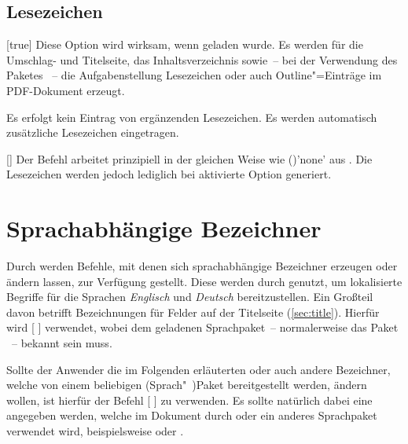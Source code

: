 \begin{Declaration*}{}
\begin{Declaration*}{}
\begin{Declaration*}{}
\subsection{Lesezeichen}
%
%
\begin{Declaration}{}[true]%
\printdeclarationlist%
%
%
%
%
%
%
%
Diese Option wird wirksam, wenn  geladen wurde. Es werden für 
die Umschlag- und Titelseite, das Inhaltsverzeichnis sowie~-- bei der 
Verwendung des Paketes ~-- die Aufgabenstellung 
Lesezeichen oder auch Outline"=Einträge im PDF-Dokument erzeugt.
%
\begin{values}{}
\itemfalse
  Es erfolgt kein Eintrag von ergänzenden Lesezeichen.
\itemtrue*
  Es werden automatisch zusätzliche Lesezeichen eingetragen.
\end{values}
\end{Declaration}

\begin{Declaration}{%
  []%
}%
\printdeclarationlist%
%
Der Befehl  arbeitet prinzipiell in der gleichen Weise wie 
()'none' aus . Die 
Lesezeichen werden jedoch lediglich bei aktivierte Option  
generiert.
\end{Declaration}



\section{Sprachabhängige Bezeichner}
%
%
%
%
Durch \KOMAScript{} werden Befehle, mit denen sich sprachabhängige Bezeichner 
erzeugen oder ändern lassen, zur Verfügung gestellt. Diese werden durch 
\TUDScript genutzt, um lokalisierte Begriffe für die Sprachen \emph{Englisch} 
und \emph{Deutsch} bereitzustellen. Ein Großteil davon betrifft Bezeichnungen 
für Felder auf der Titelseite (\autoref{sec:title}). Hierfür wird
[%
]
verwendet, wobei  dem geladenen Sprachpaket~-- normalerweise das 
Paket ~-- bekannt sein muss.

Sollte der Anwender die im Folgenden erläuterten oder auch andere Bezeichner, 
welche von einem beliebigen (Sprach"~)Paket bereitgestellt werden, ändern 
wollen, ist hierfür der Befehl
[%
] 
zu verwenden. Es sollte natürlich dabei eine  angegeben werden, 
welche im Dokument durch  oder ein anderes Sprachpaket verwendet 
wird, beispielsweise  oder . 


\end{Declaration*}
\end{Declaration*}
\end{Declaration*}
